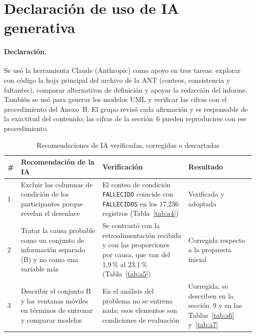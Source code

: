 \section{Declaración de uso de IA generativa}

\paragraph{Declaración.} Se usó la herramienta Claude (Anthropic) como apoyo en tres tareas: explorar con código la hoja principal del archivo de la ANT (conteos, consistencia y faltantes), comparar alternativas de definición y apoyar la redacción del informe. También se usó para generar los modelos UML y verificar las cifras con el procedimiento del Anexo~B. El grupo revisó cada afirmación y es responsable de la exactitud del contenido; las cifras de la sección~6 pueden reproducirse con ese procedimiento.

\begin{table}[H]
\centering
\small
\caption{Recomendaciones de IA verificadas, corregidas o descartadas}
\label{tab:bitacora}
\begin{tabularx}{\textwidth}{p{0.7cm}X X p{3.0cm}}
\toprule
\# & Recomendación de la IA & Verificación & Resultado \\
\midrule
1 & Excluir las columnas de condición de los participantes porque revelan el desenlace & El conteo de condición \texttt{FALLECIDO} coincide con \texttt{FALLECIDOS} en los 17.236 registros (Tabla~\ref{tab:a4}) & Verificada y adoptada \\
2 & Tratar la causa probable como un conjunto de información separado (B) y no como una variable más & Se contrastó con la retroalimentación recibida y con las proporciones por causa, que van del 1,9\,\% al 23,1\,\% (Tabla~\ref{tab:a5}) & Corregida respecto a la propuesta inicial \\
3 & Describir el conjunto B y las ventanas móviles en términos de entrenar y comparar modelos & En el análisis del problema no se entrena nada; esos elementos son condiciones de evaluación & Corregida; se describen en la sección~9 y en las Tablas~\ref{tab:a6} y~\ref{tab:a7} \\
\bottomrule
\end{tabularx}
\end{table}
